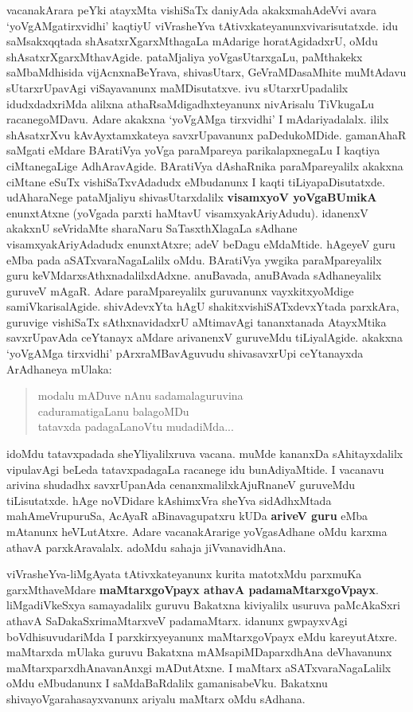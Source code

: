 vacanakArara peYki atayxMta vishiSaTx daniyAda akakxmahAdeVvi avara `yoVgAMgatirxvidhi' kaqtiyU viVrasheYva tAtivxkateyanunx\break vivarisutatxde.  idu saMsakxqqtada shAsatxrXgarxMthagaLa mAdarige horatAgidadxrU, oMdu shAsatxrXgarxMthavAgide. pataMjaliya yoVgasUtarxgaLu, paMthakekx saMbaMdhisida vijAcnxnaBeYrava, shivasUtarx, GeVraMDasaMhite muMtAdavu sUtarxrUpavAgi viSayavanunx maMDisutatxve. ivu sUtarxrUpadalilx idudxdadxriMda alilxna athaRsaMdigadhxteyanunx nivArisalu TiVkugaLu racanegoMDavu. Adare akakxna `yoVgAMga tirxvidhi' I mAdariyadalalx. ililx shAsatxrXvu kAvAyxtamxkateya savxrUpavanunx paDedukoMDide. gamanAhaR saMgati eMdare BAratiVya yoVga paraMpareya parikalapxnegaLu I kaqtiya ciMtanegaLige AdhAravAgide. BAratiVya dAshaRnika paraMpareyalilx akakxna ciMtane eSuTx vishiSaTxvAdadudx eMbudanunx I kaqti tiLiyapaDisutatxde. udAharaNege pataMjaliyu shivasUtarxdalilx \textbf{visamxyoV yoVga\-BUmikA} enunxtAtxne (yoVgada parxti haMtavU visamxyakAriyAdudu). idanenxV akakxnU seVridaMte sharaNaru SaTasxthXlagaLa sAdhane visamxyakAriyAdadudx enunxtAtxre; adeV beDagu eMdaMtide. hAgeyeV guru eMba pada aSATxvaraNagaLalilx oMdu. BAratiVya ywgika paraMpareyalilx guru keVMdarxsAthxnadalilxdAdxne. anuBavada, anuBAvada sAdhaneyalilx guruveV mAgaR. Adare paraMpareyalilx guruvanunx vayxkitx\-yoMdige samiVkarisalAgide. shivAdevxYta hAgU shakitxvishiSATxdevxYtada parxkAra, guruvige vishiSaTx sAthxnavidadxrU aMtima\-vAgi tananxtanada AtayxMtika savxrUpavAda ceYtanayx aMdare arivanenxV guruveMdu tiLiyalAgide. akakxna `yoVgAMga tirxvidhi'  pArxraMBavAguvudu  shivasavxrUpi ceYtanayxda ArAdhaneya mUlaka:
\begin{quote}
modalu mADuve nAnu sadamalaguruvina\\
caduramatigaLanu balagoMDu\\
tatavxda padagaLanoVtu mudadiMda...
\end{quote}

idoMdu tatavxpadada sheYliyalilxruva vacana. muMde kananxDa sAhitayxdalilx vipulavAgi beLeda tatavxpadagaLa racanege idu bunAdiyaMtide. I vacanavu arivina shudadhx savxrUpanAda cenanxmalilxkAjuRnaneV guruveMdu tiLisutatxde. hAge noVDidare kAshimxVra sheYva sidAdhxMtada mahAmeVrupuruSa, AcAyaR aBinavagupatxru kUDa \textbf{ariveV guru} eMba mAtanunx heVLutAtxre. Adare vacanakArarige yoVgasAdhane oMdu karxma athavA parxkAravalalx. adoMdu sahaja jiVvanavidhAna.

viVrasheYva-liMgAyata tAtivxkateyanunx kurita matotxMdu parxmuKa garxMthaveMdare \textbf{maMtarxgoVpayx athavA padamaMtarxgoVpayx}. liMgadiVkeSxya samayadalilx guruvu Bakatxna kiviyalilx usuruva paMcAkaSxri athavA SaDakaSxrimaMtarxveV padamaMtarx. idanunx gwpayxvAgi boVdhisuvudariMda I parxkirxyeyanunx maMtarxgoVpayx eMdu kareyutAtxre. maMtarxda mUlaka guruvu Bakatxna mAMsapiMDaparxdhAna deVhavanunx maMtarxparxdhAnavanAnxgi mADutAtxne. I maMtarx aSATxvaraNagaLalilx oMdu eMbudanunx I saMdaBaRdalilx gamanisabeVku. Bakatxnu shivayoVgarahasayxvanunx ariyalu maMtarx oMdu sAdhana.

